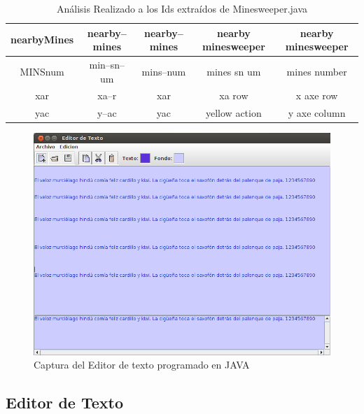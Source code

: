 \begin{table}
\begin{tabular}{| c | c | c | c | c |}
nearbyMines&nearby--mines&nearby--mines&nearby minesweeper&nearby minesweeper\\ \hline
MINSnum&min--sn--um&mins--num&mines sn um&mines number\\ \hline
xar&xa--r&xar&xa row&x axe row\\ \hline
yac&y--ac&yac&yellow action&y axe column\\ \hline

  \end{tabular}
	 
   \caption{Análisis Realizado a los Ids extraídos de Minesweeper.java}
   \label{tabla5}
     
\end{table}

\clearpage %

\begin{figure}[t] %
\centerline{%
\includegraphics[scale= 0.65]{./cap4/caso_02.png}
}
\caption{Captura del Editor de texto programado en JAVA}
\label{caso2}
\end{figure}

\subsection{Editor de Texto}

